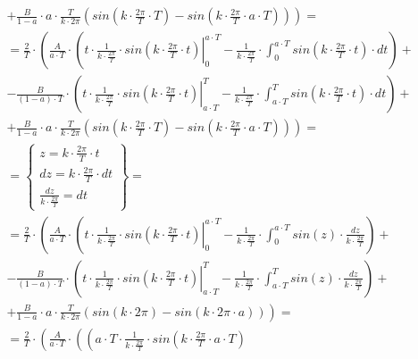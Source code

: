 \begin{task}
\begin{align*}
&+\left. \frac{B}{1-a}\cdot a \cdot \frac{T}{k \cdot 2\pi} \left( sin\left(k \cdot \frac{2\pi}{T} \cdot T\right) - sin\left(k \cdot \frac{2\pi}{T} \cdot a \cdot T\right) \right)\right)=\\
&=\frac{2}{T}\cdot\left( \frac{A}{a \cdot T} \cdot \left( \left. t \cdot \frac{1}{k \cdot \frac{2\pi}{T}} \cdot sin\left( k \cdot \frac{2\pi}{T} \cdot t\right)
\right|_{0}^{a\cdot T} - \frac{1}{k \cdot \frac{2\pi}{T}} \cdot \int_{0}^{a\cdot T} sin\left( k \cdot \frac{2\pi}{T} \cdot t\right) \cdot dt\right) \right. + \\
&-\left.\frac{B}{\left(1-a\right)\cdot T}\cdot \left( \left. t \cdot \frac{1}{k \cdot \frac{2\pi}{T}} \cdot sin\left( k \cdot \frac{2\pi}{T} \cdot t\right) \right|_{a \cdot T}^{T} - \frac{1}{k \cdot \frac{2\pi}{T}} \cdot \int_{a \cdot T}^{T}  sin\left( k \cdot \frac{2\pi}{T} \cdot t\right) \cdot dt \right)\right. +\\
&+\left. \frac{B}{1-a}\cdot a \cdot \frac{T}{k \cdot 2\pi} \left( sin\left(k \cdot \frac{2\pi}{T} \cdot T\right) - sin\left(k \cdot \frac{2\pi}{T} \cdot a \cdot T\right) \right)\right)=\\
&=\left\{\begin{array}{l}
z = k \cdot \frac{2\pi}{T} \cdot t \\
dz = k \cdot \frac{2\pi}{T} \cdot dt \\
\frac{dz}{k \cdot \frac{2\pi}{T}} = dt
\end{array}\right\}=\\
&=\frac{2}{T}\cdot\left( \frac{A}{a \cdot T} \cdot \left( \left. t \cdot \frac{1}{k \cdot \frac{2\pi}{T}} \cdot sin\left( k \cdot \frac{2\pi}{T} \cdot t\right)
\right|_{0}^{a\cdot T} - \frac{1}{k \cdot \frac{2\pi}{T}} \cdot \int_{0}^{a\cdot T} sin\left(z\right) \cdot \frac{dz}{k \cdot \frac{2\pi}{T}}\right) \right. + \\
&-\left.\frac{B}{\left(1-a\right)\cdot T}\cdot \left( \left. t \cdot \frac{1}{k \cdot \frac{2\pi}{T}} \cdot sin\left( k \cdot \frac{2\pi}{T} \cdot t\right) \right|_{a \cdot T}^{T} - \frac{1}{k \cdot \frac{2\pi}{T}} \cdot \int_{a \cdot T}^{T}  sin\left( z\right) \cdot \frac{dz}{k \cdot \frac{2\pi}{T}} \right)\right. +\\
&+\left. \frac{B}{1-a}\cdot a \cdot \frac{T}{k \cdot 2\pi} \left( sin\left(k \cdot 2\pi\right) - sin\left(k \cdot 2\pi \cdot a\right) \right)\right)=\\
&=\frac{2}{T}\cdot\left( \frac{A}{a \cdot T} \cdot \left( \left( a\cdot T \cdot \frac{1}{k \cdot \frac{2\pi}{T}} \cdot sin\left( k \cdot \frac{2\pi}{T} \cdot a\cdot T\right)

\end{align*}
\end{task}
